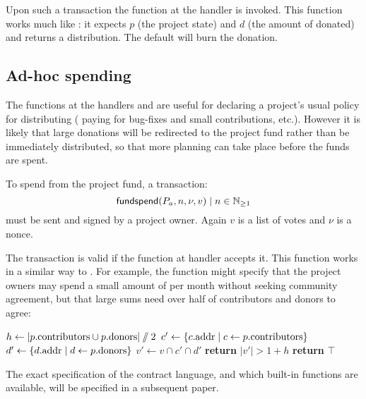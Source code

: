 Upon such a transaction the function at the  handler is
invoked. This function works much like : it expects $p$
(the project state) and $d$ (the amount of \oscoin{} donated) and returns a
distribution. The default will burn the donation.

\subsection{Ad-hoc spending}

The functions at the handlers  and 
are useful for declaring a project's usual policy for distributing \oscoin{}
(\eg{} paying for bug-fixes and small contributions, etc.). However it is likely
that large donations will be redirected to the project fund rather than be
immediately distributed, so that more planning can take place before the funds
are spent.

To spend \oscoin{} from the project fund, a transaction:
\[
\mathsf{fundspend}\lparen P_a, n, \nu, v\rparen \mid n \in \mathbb{N}_{\geq 1}
\]
must be sent and signed by a project owner. Again $v$ is a list of votes and
$\nu$ is a nonce.

The transaction is valid if the function at handler  accepts
it. This function works in a similar way to . For
example, the function might specify that the project owners may spend a small
amount of \oscoin{} per month without seeking community agreement, but that
large sums need over half of contributors and donors to agree:
\medskip
\begin{algorithmic}[0]
            \State $h \gets |p.{\mathrm{contributors}} \cup p.{\mathrm{donors}}| \sslash 2$
            \State $c' \gets \{ c.{\mathrm{addr}} \mid c \gets p.{\mathrm{contributors}} \}$
            \State $d' \gets \{ d.{\mathrm{addr}} \mid d \gets p.{\mathrm{donors}} \}$
            \State $v' \gets v \cap c' \cap d'$
            \State \textbf{return} $|v'| > 1 + h$
            \Else
            \State \textbf{return} $\top$
        \EndIf
    \EndProcedure
\end{algorithmic}

The exact specification of the contract language, and which built-in functions
are available, will be specified in a subsequent paper.
